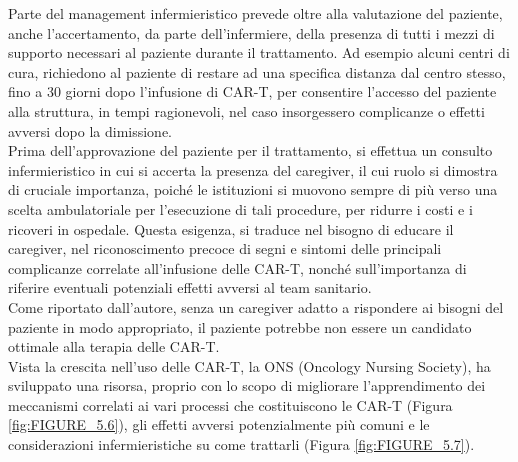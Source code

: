 Parte del management infermieristico prevede oltre alla valutazione del paziente, anche l’accertamento, da parte 
dell’infermiere, della presenza di tutti i mezzi di supporto necessari al paziente durante il trattamento. 
Ad esempio alcuni centri di cura, richiedono al paziente di restare ad una specifica distanza dal centro stesso, 
fino a 30 giorni dopo l’infusione di CAR-T, per consentire l’accesso del paziente alla struttura, in tempi ragionevoli, 
nel caso insorgessero complicanze o effetti avversi dopo la dimissione\cite{article2}.\\ 
Prima dell’approvazione del paziente per il trattamento, si effettua un consulto infermieristico in cui si accerta 
la presenza del caregiver, il cui ruolo si dimostra di cruciale importanza,
poiché le istituzioni si muovono sempre di più verso una scelta ambulatoriale per l’esecuzione di tali procedure, 
per ridurre i costi e i ricoveri in ospedale\cite{article2}. 
Questa esigenza, si traduce nel bisogno di educare il caregiver, nel riconoscimento precoce di segni e sintomi delle 
principali complicanze correlate all’infusione delle CAR-T, nonché sull’importanza di riferire eventuali potenziali 
effetti avversi al team sanitario.\\ Come riportato dall’autore, senza un caregiver adatto a rispondere ai 
bisogni del paziente in modo appropriato, il paziente potrebbe non essere un candidato ottimale 
alla terapia delle CAR-T\cite{article2}.\\

Vista la crescita nell’uso delle CAR-T, la ONS (Oncology Nursing Society), ha sviluppato una risorsa, 
proprio con lo scopo di migliorare l’apprendimento dei meccanismi correlati ai vari processi che costituiscono 
le CAR-T (Figura \ref{fig:FIGURE_5.6}), gli effetti avversi potenzialmente più comuni e le considerazioni infermieristiche 
su come trattarli (Figura \ref{fig:FIGURE_5.7})\cite{ONSCART}.

